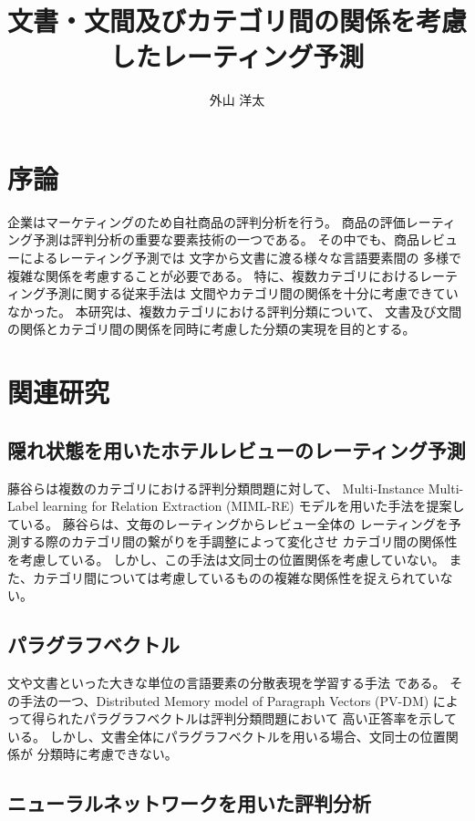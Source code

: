\documentclass{ttisummary}
\title{文書・文間及びカテゴリ間の関係を考慮したレーティング予測}
\author{外山 洋太}
\begin{document}
\section{序論}

企業はマーケティングのため自社商品の評判分析を行う。
商品の評価レーティング予測は評判分析の重要な要素技術の一つである。
その中でも、商品レビューによるレーティング予測では
文字から文書に渡る様々な言語要素間の
多様で複雑な関係を考慮することが必要である。
特に、複数カテゴリにおけるレーティング予測に関する従来手法\cite{fujitani15}は
文間やカテゴリ間の関係を十分に考慮できていなかった。
本研究は、複数カテゴリにおける評判分類について、
文書及び文間の関係とカテゴリ間の関係を同時に考慮した分類の実現を目的とする。



\section{関連研究}

\subsection{隠れ状態を用いたホテルレビューのレーティング予測}

藤谷ら\cite{fujitani15}は複数のカテゴリにおける評判分類問題に対して、
Multi-Instance Multi-Label learning for Relation Extraction (MIML-RE)
\cite{mihai12}モデルを用いた手法を提案している。
藤谷ら\cite{fujitani15}は、文毎のレーティングからレビュー全体の
レーティングを予測する際のカテゴリ間の繋がりを手調整によって変化させ
カテゴリ間の関係性を考慮している。
しかし、この手法は文同士の位置関係を考慮していない。
また、カテゴリ間については考慮しているものの複雑な関係性を捉えられていない。


\subsection{パラグラフベクトル}

文や文書といった大きな単位の言語要素の分散表現を学習する手法\cite{quoc14}
である。
その手法の一つ、Distributed Memory model of Paragraph Vectors (PV-DM)
によって得られたパラグラフベクトルは評判分類問題において
高い正答率を示している\cite{quoc14}。
しかし、文書全体にパラグラフベクトルを用いる場合、文同士の位置関係が
分類時に考慮できない。


\subsection{ニューラルネットワークを用いた評判分析}
\end{document}

